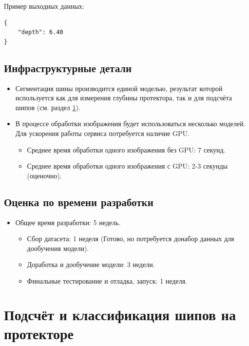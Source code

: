 \documentclass[12pt]{article}
\begin{document}
Пример выходных данных:
\begin{verbatim}
{
	"depth": 6.40
}
\end{verbatim}


\subsection{Инфраструктурные детали}
\begin{itemize}
	\item Сегментация шины производится единой моделью, результат которой используется как для измерения глубины протектора, так и для подсчёта шипов (см. раздел \ref{sec:spike_counting}).
	\item В процессе обработки изображения будет использоваться несколько моделей. Для ускорения работы сервиса потребуется наличие GPU.
	      \begin{itemize}
		      \item Среднее время обработки одного изображения без GPU: 7 секунд.
		      \item Среднее время обработки одного изображения с GPU: 2-3 секунды (оценочно).
	      \end{itemize}
\end{itemize}

\subsection{Оценка по времени разработки}
\begin{itemize}
	\item Общее время разработки: 5 недель.
	      \begin{itemize}
		      \item Сбор датасета: 1 неделя (Готово, но потребуется донабор данных для дообучения модели).
		      \item Доработка и дообучение модели: 3 недели.
		      \item Финальные тестирование и отладка, запуск: 1 неделя.
	      \end{itemize}

\end{itemize}

\section{Подсчёт и классификация шипов на протекторе}
\label{sec:spike_counting}
\end{document}
